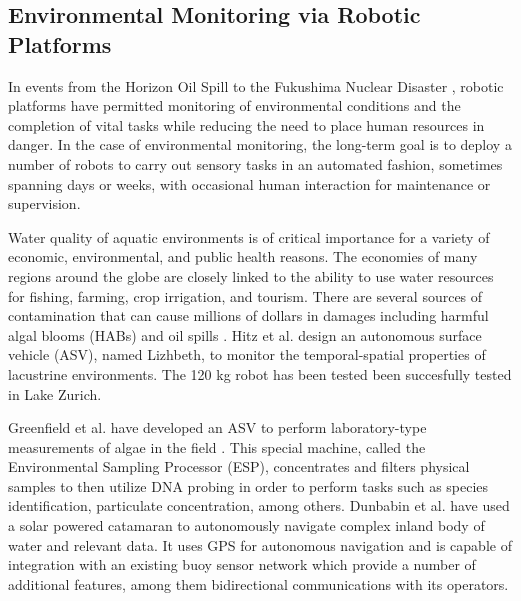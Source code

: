 	\subsection{Environmental Monitoring via Robotic Platforms}%

		In events from the Horizon Oil Spill \cite{dssoa} to the Fukushima Nuclear Disaster \cite{Hasegawa2012}, robotic platforms have permitted monitoring of environmental conditions and the completion of vital tasks while reducing the need to place human resources in danger. In the case of environmental monitoring, the long-term goal is to deploy a number of robots to carry out sensory tasks in an automated fashion, sometimes spanning days or weeks, with occasional human interaction for maintenance or supervision.

		Water quality of aquatic environments is of critical importance for a variety of economic, environmental, and public health reasons. The economies of many regions around the globe are closely linked to the ability to use water resources for fishing, farming, crop irrigation, and tourism. There are several sources of contamination that can cause millions of dollars in damages including harmful algal blooms (HABs) and oil spills \cite{EPA2015a}. Hitz et al. \cite{Hitz2012} design an autonomous surface vehicle (ASV), named Lizhbeth,  to monitor the temporal-spatial properties of lacustrine environments. The 120 kg robot has been tested been succesfully tested in Lake Zurich. 

		Greenfield et al. have developed an ASV to perform laboratory-type measurements of algae in the field \cite{Greenfield2008}. This special machine, called the Environmental Sampling Processor (ESP), concentrates and filters physical samples to then utilize DNA probing in order to perform tasks such as species identification, particulate concentration, among others. Dunbabin et al. \cite{Dunbabin2009} have used a solar powered catamaran to autonomously navigate complex inland body of water and relevant data. It uses GPS for autonomous navigation and is capable of integration with an existing buoy sensor network which provide a number of additional features, among them bidirectional communications with its operators.  

